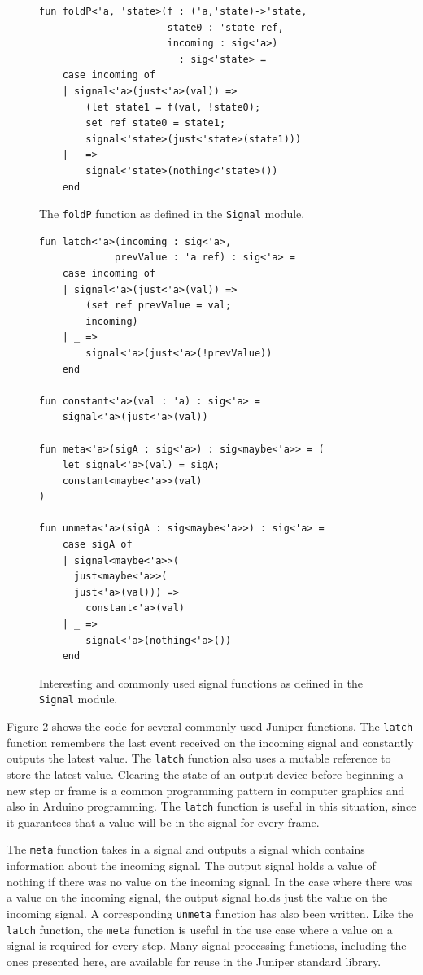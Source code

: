 \documentclass{sigplanconf}
\begin{document}
\begin{figure}
\begin{verbatim}
fun foldP<'a, 'state>(f : ('a,'state)->'state,
                      state0 : 'state ref,
                      incoming : sig<'a>)
                        : sig<'state> =
    case incoming of
    | signal<'a>(just<'a>(val)) =>
        (let state1 = f(val, !state0);
        set ref state0 = state1;
        signal<'state>(just<'state>(state1)))
    | _ =>
        signal<'state>(nothing<'state>())
    end
\end{verbatim}
\caption{The \texttt{foldP} function as defined in the \texttt{Signal} module.}
\label{fig:foldP}
\end{figure}

\begin{figure}
\begin{verbatim}
fun latch<'a>(incoming : sig<'a>,
             prevValue : 'a ref) : sig<'a> =
    case incoming of
    | signal<'a>(just<'a>(val)) =>
        (set ref prevValue = val;
        incoming)
    | _ =>
        signal<'a>(just<'a>(!prevValue))
    end

fun constant<'a>(val : 'a) : sig<'a> =
    signal<'a>(just<'a>(val))

fun meta<'a>(sigA : sig<'a>) : sig<maybe<'a>> = (
    let signal<'a>(val) = sigA;
    constant<maybe<'a>>(val)
)

fun unmeta<'a>(sigA : sig<maybe<'a>>) : sig<'a> =
    case sigA of
    | signal<maybe<'a>>(
      just<maybe<'a>>(
      just<'a>(val))) =>
        constant<'a>(val)
    | _ =>
        signal<'a>(nothing<'a>())
    end
\end{verbatim}
\caption{Interesting and commonly used signal functions as defined in the \texttt{Signal} module.}
\label{fig:interestingsig}
\end{figure}

Figure \ref{fig:interestingsig} shows the code for several commonly used Juniper functions. The \texttt{latch} function remembers the last event received on the incoming signal and constantly outputs the latest value. The \texttt{latch} function also uses a mutable reference to store the latest value. Clearing the state of an output device before beginning a new step or frame is a common programming pattern in computer graphics and also in Arduino programming. The \texttt{latch} function is useful in this situation, since it guarantees that a value will be in the signal for every frame.

The \texttt{meta} function takes in a signal and outputs a signal which contains information about the incoming signal. The output signal holds a value of nothing if there was no value on the incoming signal. In the case where there was a value on the incoming signal, the output signal holds just the value on the incoming signal. A corresponding \texttt{unmeta} function has also been written. Like the \texttt{latch} function, the \texttt{meta} function is useful in the use case where a value on a signal is required for every step. Many signal processing functions, including the ones presented here, are available for reuse in the Juniper standard library.
\end{document}

